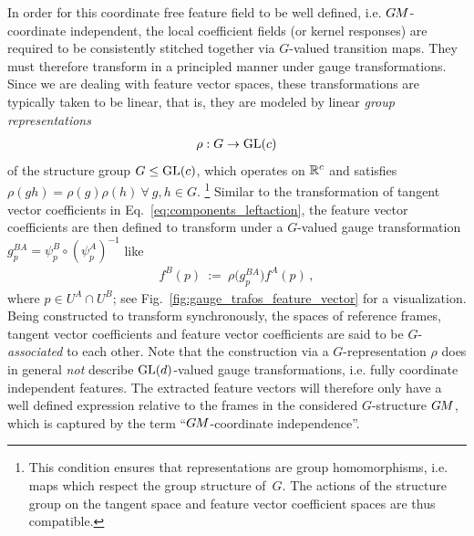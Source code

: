 In order for this coordinate free feature field to be well defined, i.e. $G\mkern-1.4muM$-coordinate independent, the local coefficient fields (or kernel responses) are required to be consistently stitched together via $G$-valued transition maps.
They must therefore transform in a principled manner under gauge transformations.
Since we are dealing with feature vector spaces, these transformations are typically taken to be linear, that is, they are modeled by linear \emph{group representations}
\begin{align}\label{eq:group_representation}
    \rho:G\to\operatorname{GL}(c)
\end{align}
of the structure group $G\leq\operatorname{GL}(c)$, which operates on $\mathbb{R}^c$ and satisfies $\rho(gh)=\rho(g)\rho(h)\ \forall\ g,h\in G$.%
\footnote{\label{footnote:repr_group_homomorphism}
    This condition ensures that representations are group homomorphisms, i.e. maps which respect the group structure of~$G$.
    The actions of the structure group on the tangent space and feature vector coefficient spaces are thus compatible.
}
Similar to the transformation of tangent vector coefficients in Eq.~\eqref{eq:components_leftaction}, the feature vector coefficients are then defined to transform under a $G$-valued gauge transformation $g_p^{BA}=\psi_p^B\!\circ\!\left(\psi_p^A\right)^{-1}$ like
\begin{align}\label{eq:gauge_trafo_features}
  f^B(p)\ :=\ \rho\big( g_p^{BA}\big) f^A(p) \,,
\end{align}
where $p\in U^A\cap U^B$; see Fig.~\ref{fig:gauge_trafos_feature_vector} for a visualization.
Being constructed to transform synchronously, the spaces of reference frames, tangent vector coefficients and feature vector coefficients are said to be $G$-\emph{associated} to each other.
Note that the construction via a $G$-representation $\rho$ does in general \emph{not} describe $\operatorname{GL}(d)$-valued gauge transformations, i.e. fully coordinate independent features.
The extracted feature vectors will therefore only have a well defined expression relative to the frames in the considered $G$-structure $G\mkern-1.4muM$, which is captured by the term ``$G\mkern-1.4muM$-coordinate independence''.


